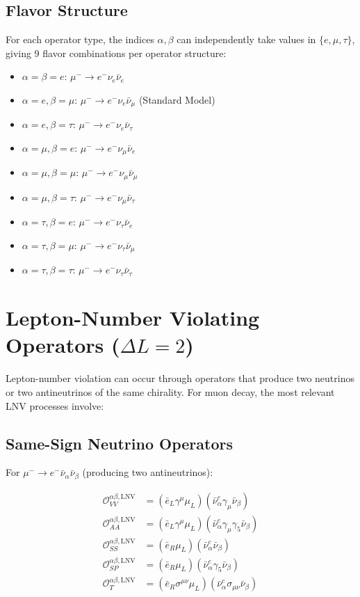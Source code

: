 \documentclass[11pt,a4paper]{article}
\begin{document}
\subsection{Flavor Structure}

For each operator type, the indices $\alpha, \beta$ can independently take values in $\{e, \mu, \tau\}$, giving 9 flavor combinations per operator structure:
\begin{itemize}
\item $\alpha = \beta = e$: $\mu^- \to e^- \nu_e \bar{\nu}_e$
\item $\alpha = e, \beta = \mu$: $\mu^- \to e^- \nu_e \bar{\nu}_\mu$ (Standard Model)
\item $\alpha = e, \beta = \tau$: $\mu^- \to e^- \nu_e \bar{\nu}_\tau$
\item $\alpha = \mu, \beta = e$: $\mu^- \to e^- \nu_\mu \bar{\nu}_e$
\item $\alpha = \mu, \beta = \mu$: $\mu^- \to e^- \nu_\mu \bar{\nu}_\mu$
\item $\alpha = \mu, \beta = \tau$: $\mu^- \to e^- \nu_\mu \bar{\nu}_\tau$
\item $\alpha = \tau, \beta = e$: $\mu^- \to e^- \nu_\tau \bar{\nu}_e$
\item $\alpha = \tau, \beta = \mu$: $\mu^- \to e^- \nu_\tau \bar{\nu}_\mu$
\item $\alpha = \tau, \beta = \tau$: $\mu^- \to e^- \nu_\tau \bar{\nu}_\tau$
\end{itemize}

\section{Lepton-Number Violating Operators ($\Delta L = 2$)}

Lepton-number violation can occur through operators that produce two neutrinos or two antineutrinos of the same chirality. For muon decay, the most relevant LNV processes involve:

\subsection{Same-Sign Neutrino Operators}

For $\mu^- \to e^- \bar{\nu}_\alpha \bar{\nu}_\beta$ (producing two antineutrinos):

\begin{align}
\mathcal{O}_{VV}^{\alpha\beta,\text{LNV}} &= (\bar{e}_L \gamma^\mu \mu_L)(\bar{\nu}_{\alpha}^c \gamma_\mu \bar{\nu}_\beta) \\
\mathcal{O}_{AA}^{\alpha\beta,\text{LNV}} &= (\bar{e}_L \gamma^\mu \mu_L)(\bar{\nu}_{\alpha}^c \gamma_\mu \gamma_5 \bar{\nu}_\beta) \\
\mathcal{O}_{SS}^{\alpha\beta,\text{LNV}} &= (\bar{e}_R \mu_L)(\bar{\nu}_{\alpha}^c \bar{\nu}_\beta) \\
\mathcal{O}_{SP}^{\alpha\beta,\text{LNV}} &= (\bar{e}_R \mu_L)(\bar{\nu}_{\alpha}^c \gamma_5 \bar{\nu}_\beta) \\
\mathcal{O}_{T}^{\alpha\beta,\text{LNV}} &= (\bar{e}_R \sigma^{\mu\nu} \mu_L)(\bar{\nu}_{\alpha}^c \sigma_{\mu\nu} \bar{\nu}_\beta)
\end{align}
\end{document}
